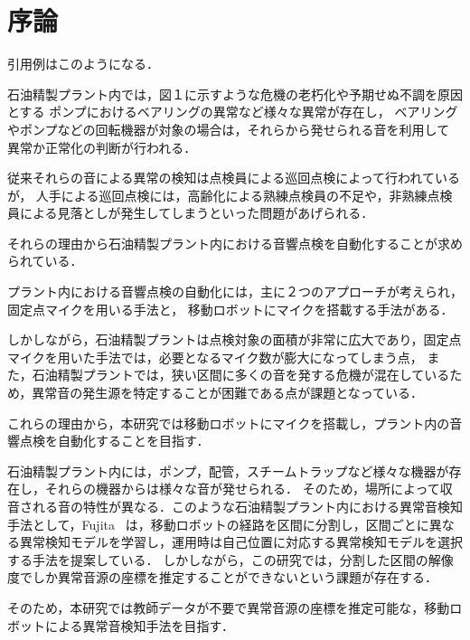 \documentclass[../main]{subfiles}
\begin{document}
\graphicspath{{../figures/}}

\section{序論}
引用例は\cite{Schlick1994}\cite{Chikushi2020}このようになる．

石油精製プラント内では，図１に示すような危機の老朽化や予期せぬ不調を原因とする
ポンプにおけるベアリングの異常など様々な異常が存在し，
ベアリングやポンプなどの回転機器が対象の場合は，それらから発せられる音を利用して
異常か正常化の判断が行われる．

従来それらの音による異常の検知は点検員による巡回点検によって行われているが，
人手による巡回点検には，高齢化による熟練点検員の不足や，非熟練点検員による見落としが発生してしまうといった問題があげられる．

それらの理由から石油精製プラント内における音響点検を自動化することが求められている．


プラント内における音響点検の自動化には，主に２つのアプローチが考えられ，固定点マイクを用いる手法と，
移動ロボットにマイクを搭載する手法がある．

しかしながら，石油精製プラントは点検対象の面積が非常に広大であり，固定点マイクを用いた手法では，必要となるマイク数が膨大になってしまう点，
また，石油精製プラントでは，狭い区間に多くの音を発する危機が混在しているため，異常音の発生源を特定することが困難である点が課題となっている．

これらの理由から，本研究では移動ロボットにマイクを搭載し，プラント内の音響点検を自動化することを目指す．

石油精製プラント内には，ポンプ，配管，スチームトラップなど様々な機器が存在し，それらの機器からは様々な音が発せられる．
そのため，場所によって収音される音の特性が異なる．このような石油精製プラント内における異常音検知手法として，Fujita~\cite{fujita2022}
は，移動ロボットの経路を区間に分割し，区間ごとに異なる異常検知モデルを学習し，運用時は自己位置に対応する異常検知モデルを選択する手法を提案している．
しかしながら，この研究では，分割した区間の解像度でしか異常音源の座標を推定することができないという課題が存在する．


そのため，本研究では教師データが不要で異常音源の座標を推定可能な，移動ロボットによる異常音検知手法を目指す．
\end{document}
